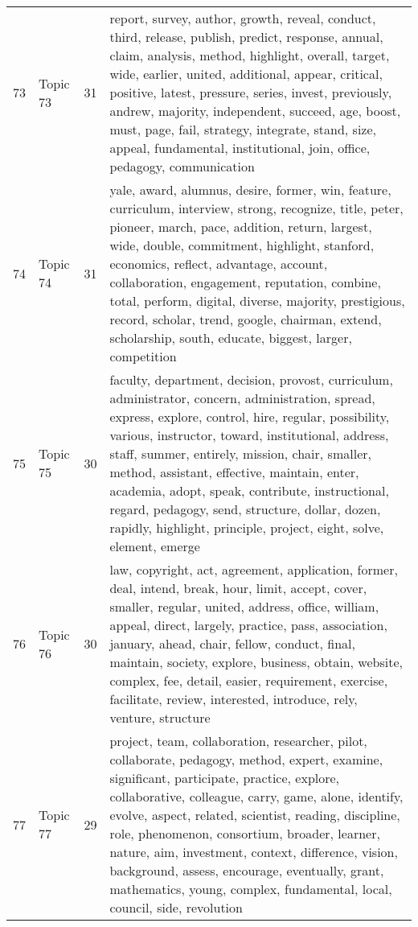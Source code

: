 \begin{table}[ht]
{\begin{tabularx}{\textwidth}{llrX}
   73 & Topic 73 & 31 & report, survey, author, growth, reveal, conduct, third, release, publish, predict, response, annual, claim, analysis, method, highlight, overall, target, wide, earlier, united, additional, appear, critical, positive, latest, pressure, series, invest, previously, andrew, majority, independent, succeed, age, boost, must, page, fail, strategy, integrate, stand, size, appeal, fundamental, institutional, join, office, pedagogy, communication \\ 
   74 & Topic 74 & 31 & yale, award, alumnus, desire, former, win, feature, curriculum, interview, strong, recognize, title, peter, pioneer, march, pace, addition, return, largest, wide, double, commitment, highlight, stanford, economics, reflect, advantage, account, collaboration, engagement, reputation, combine, total, perform, digital, diverse, majority, prestigious, record, scholar, trend, google, chairman, extend, scholarship, south, educate, biggest, larger, competition \\ 
   75 & Topic 75 & 30 & faculty, department, decision, provost, curriculum, administrator, concern, administration, spread, express, explore, control, hire, regular, possibility, various, instructor, toward, institutional, address, staff, summer, entirely, mission, chair, smaller, method, assistant, effective, maintain, enter, academia, adopt, speak, contribute, instructional, regard, pedagogy, send, structure, dollar, dozen, rapidly, highlight, principle, project, eight, solve, element, emerge \\ 
   76 & Topic 76 & 30 & law, copyright, act, agreement, application, former, deal, intend, break, hour, limit, accept, cover, smaller, regular, united, address, office, william, appeal, direct, largely, practice, pass, association, january, ahead, chair, fellow, conduct, final, maintain, society, explore, business, obtain, website, complex, fee, detail, easier, requirement, exercise, facilitate, review, interested, introduce, rely, venture, structure \\ 
   77 & Topic 77 & 29 & project, team, collaboration, researcher, pilot, collaborate, pedagogy, method, expert, examine, significant, participate, practice, explore, collaborative, colleague, carry, game, alone, identify, evolve, aspect, related, scientist, reading, discipline, role, phenomenon, consortium, broader, learner, nature, aim, investment, context, difference, vision, background, assess, encourage, eventually, grant, mathematics, young, complex, fundamental, local, council, side, revolution \\ 

\end{tabularx}}
\end{table}
